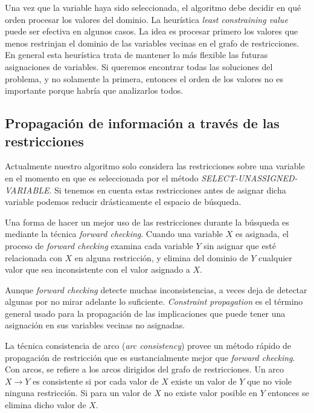 Una vez que la variable haya sido seleccionada, el algoritmo debe decidir en qu\'e orden procesar los valores del dominio. La heur\'istica \emph{least constraining value} puede ser efectiva en algunos casos. La idea es procesar primero los valores que menos restrinjan el dominio de las variables vecinas en el grafo de restricciones. En general esta heur\'istica trata de mantener lo m\'as flexible las futuras asignaciones de variables. Si queremos encontrar todas las soluciones del problema, y no solamente la primera, entonces el orden de los valores no es importante porque habr\'ia que analizarlos todos.

\subsection{Propagaci\'on de informaci\'on a trav\'es de las restricciones}

Actualmente nuestro algoritmo solo considera las restricciones sobre una variable en el momento en que es seleccionada por el m\'etodo \emph{SELECT-UNASSIGNED-VARIABLE}. Si tenemos en cuenta estas restricciones antes de asignar dicha variable podemos reducir dr\'asticamente el espacio de b\'usqueda.

Una forma de hacer un mejor uso de las restricciones durante la b\'usqueda es mediante la t\'ecnica \emph{forward checking}. Cuando una variable $X$ es asignada, el proceso de \emph{forward checking} examina cada variable $Y$ sin asignar que est\'e relacionada con $X$ en alguna restricci\'on, y elimina del dominio de $Y$ cualquier valor que sea inconsistente con el valor asignado a $X$.

Aunque \emph{forward checking} detecte muchas inconsistencias, a veces deja de detectar algunas por no mirar adelante lo suficiente. \emph{Constraint propagation} es el t\'ermino general usado para la propagaci\'on de las implicaciones que puede tener una asignaci\'on en sus variables vecinas no asignadas.

La t\'ecnica consistencia de arco (\emph{arc consistency}) provee un m\'etodo r\'apido de propagaci\'on de restricci\'on que es sustancialmente mejor que \emph{forward checking}. Con arcos, se refiere a los arcos dirigidos del grafo de restricciones. Un arco $X \rightarrow Y$ es consistente si por cada valor de $X$ existe un valor de $Y$ que no viole ninguna restricci\'on. Si para un valor de $X$ no existe valor posible en $Y$ entonces se elimina dicho valor de $X$.

